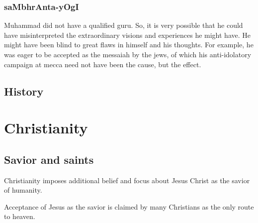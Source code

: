 \documentclass[oneside, article]{memoir}
\begin{document}
\subsubsection{saMbhrAnta-yOgI}
Muhammad did not have a qualified guru. So, it is very possible that he could have misinterpreted the extraordinary visions and experiences he might have. He might have been blind to great flaws in himself and his thoughts. For example, he was eager to be accepted as the messaiah by the jews, of which his anti-idolatory campaign at mecca need not have been the cause, but the effect.

\subsection{History}
\tbc

\section{Christianity}
\subsection{Savior and saints}
Christianity imposes additional belief and focus about Jesus Christ as the savior of humanity.

Acceptance of Jesus as the savior is claimed by many Christians as the only route to heaven.
\end{document}

